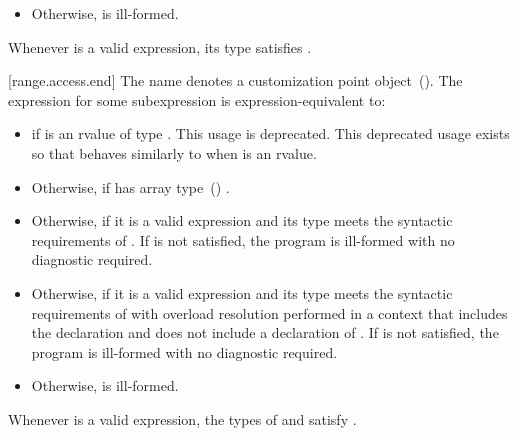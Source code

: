 {\begin{itemize}
\item
  Otherwise,  is ill-formed.
\end{itemize}

\pnum
\enternote Whenever  is a valid expression, its
type satisfies . \exitnote

[range.access.end]{}
\pnum
The name  denotes a customization point
object~(). The expression
 for some subexpression  is expression-equivalent to:

\begin{itemize}
\item
   if  is an rvalue of
  type . This usage is deprecated.
  \enternote This deprecated usage exists so that
   behaves similarly to 
   when  is an rvalue. \exitnote

\item
  Otherwise,  if  has array
  type~() .

\item
  Otherwise,  if it is a valid expression and its type  meets the
  syntactic requirements of
  . If
   is not satisfied, the program is ill-formed with
  no diagnostic required.

\item
  Otherwise,  if it is a valid expression and its type  meets the
  syntactic requirements of
   with overload
  resolution performed in a context that includes the declaration
   and does not include
  a declaration of . If  is not
  satisfied, the program is ill-formed with no diagnostic required.

\item
  Otherwise,  is ill-formed.
\end{itemize}

\pnum
\enternote Whenever  is a valid expression, the
types of  and  satisfy
. \exitnote

}
